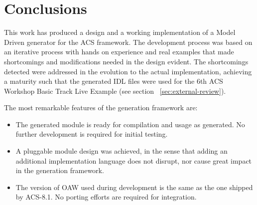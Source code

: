 \chapter{Conclusions}
\label{ch:conclusions}
This work has produced a design and a
working implementation of a Model Driven
generator for the ACS framework.
The development process was based on an iterative process with hands on
experience and real examples that made shortcomings and modifications needed
in the design evident.
The shortcomings detected were addressed in the evolution to the actual implementation,
achieving a maturity such that the generated IDL files were
used for the 6th ACS Workshop Basic Track Live Example (see section~%
\ref{sec:external-review}).

The most remarkable features of the generation framework are:
\begin{itemize}
    \item The generated module is ready for compilation and usage as generated.
    No further development is required for initial testing.
    \item A pluggable module design was achieved, in the sense that adding
    an additional implementation language does not disrupt, nor cause great
    impact in the generation framework.
    \item The version of OAW used during development is the same as
    the one shipped by ACS-8.1. No porting efforts are required for integration.
\end{itemize}

